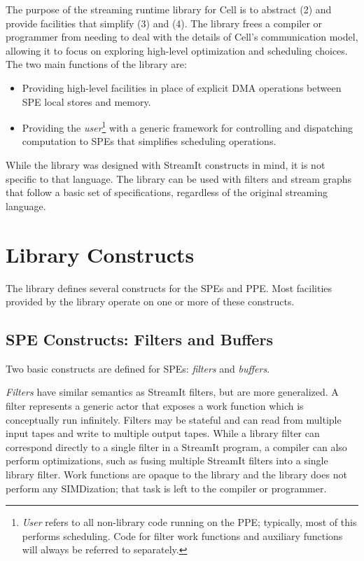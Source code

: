 The purpose of the streaming runtime library for Cell is to abstract \textsf{(2)} and provide facilities that simplify \textsf{(3)} and \textsf{(4)}. The library frees a compiler or programmer from needing to deal with the details of Cell's communication model, allowing it to focus on exploring high-level optimization and scheduling choices. The two main functions of the library are:
\begin{itemize}
\item Providing high-level facilities in place of explicit DMA operations between SPE local stores and memory.
\item Providing the \emph{user}\footnote{\emph{User} refers to all non-library code running on the PPE; typically, most of this performs scheduling. Code for filter work functions and auxiliary functions will always be referred to separately.} with a generic framework for controlling and dispatching computation to SPEs that simplifies scheduling operations.
\end{itemize}

While the library was designed with StreamIt constructs in mind, it is not specific to that language. The library can be used with filters and stream graphs that follow a basic set of specifications, regardless of the original streaming language.

\section{Library Constructs}

The library defines several constructs for the SPEs and PPE. Most facilities provided by the library operate on one or more of these constructs.

\subsection{SPE Constructs: Filters and Buffers}

Two basic constructs are defined for SPEs: \emph{filters} and \emph{buffers}.

\emph{Filters} have similar semantics as StreamIt filters, but are more generalized. A filter represents a generic actor that exposes a work function which is conceptually run infinitely. Filters may be stateful and can read from multiple input tapes and write to multiple output tapes. While a library filter can correspond directly to a single filter in a StreamIt program, a compiler can also perform optimizations, such as fusing multiple StreamIt filters into a single library filter. Work functions are opaque to the library and the library does not perform any SIMDization; that task is left to the compiler or programmer.

